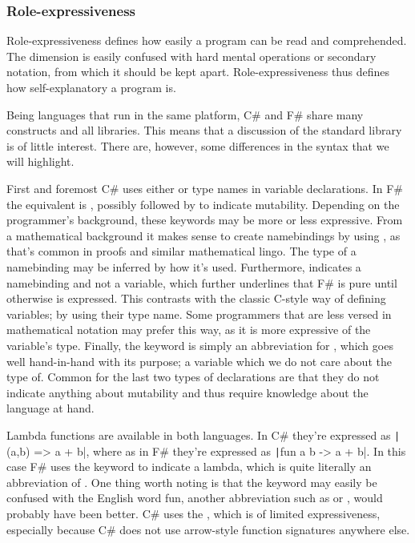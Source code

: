 \subsubsection{Role-expressiveness}
Role-expressiveness defines how easily a program can be read and comprehended. The dimension is easily confused with hard mental operations or secondary notation, from which it should be kept apart\cite{green1996usability}. Role-expressiveness thus defines how self-explanatory a program is.

Being languages that run in the same platform, C\# and F\# share many constructs and all libraries. This means that a discussion of the standard library is of little interest. There are, however, some differences in the syntax that we will highlight. 

First and foremost C\# uses either  or type names in variable declarations. In F\# the equivalent is , possibly followed by  to indicate mutability. Depending on the programmer's background, these keywords may be more or less expressive. From a mathematical background it makes sense to create namebindings by using , as that's common in proofs and similar mathematical lingo. The type of a namebinding may be inferred by how it's used. Furthermore,  indicates a namebinding and not a variable, which further underlines that F\# is pure until otherwise is expressed. This contrasts with the classic C-style way of defining variables; by using their type name. Some programmers that are less versed in mathematical notation may prefer this way, as it is more expressive of the variable's type. Finally, the  keyword is simply an abbreviation for , which goes well hand-in-hand with its purpose; a variable which we do not care about the type of. Common for the last two types of declarations are that they do not indicate anything about mutability and thus require knowledge about the language at hand.

Lambda functions are available in both languages. In C\# they're expressed as \texttt|(a,b) => a + b|, where as in F\# they're expressed as \texttt|fun a b -> a + b|. In this case F\# uses the keyword  to indicate a lambda, which is quite literally an abbreviation of . One thing worth noting is that the  keyword may easily be confused with the English word fun, another abbreviation such as  or , would probably have been better. C\# uses the \ttt{=\textgreater}, which is of limited expressiveness, especially because C\# does not use arrow-style function signatures anywhere else.


